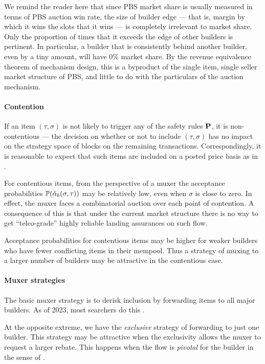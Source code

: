 We remind the reader here that since PBS market share is usually measured in terms of PBS auction win rate, the size of builder edge --- that is, margin by which it wins the slots that it wins --- is completely irrelevant to market share. 
%
Only the proportion of times that it exceeds the edge of other builders is pertinent.
%
In particular, a builder that is consistently behind another builder, even by a tiny amount, will have $0\%$ market share.
%
By the revenue equivalence theorem of mechanism design, this is a byproduct of the single item, single seller market structure of PBS, and little to do with the particulars of the auction mechanism.

\paragraph{Contention}
%
If an item $(\tau,\sigma)$ is not likely to trigger any of the safety rules $\mathbf{P}$, it is non-contentious --- the decision on whether or not to include $(\tau,\sigma)$ has no impact on the strategy space of blocks on the remaining transactions.
%
Correspondingly, it is reasonable to expect that such items are included on a posted price basis as in \cite{roughgarden2021transaction}.

For contentious items, from the perspective of a muxer the acceptance probabilities $\mathbb{P}(\tilde\alpha_b(\sigma,\tau))$ may be relatively low, even when $\sigma$ is close to zero. 
%
In effect, the muxer faces a combinatorial auction over each point of contention.
%
A consequence of this is that under the current market structure there is no way to get ``telco-grade'' highly reliable landing assurances on such flow.

Acceptance probabilities for contentious items may be higher for weaker builders who have fewer conflicting items in their mempool.
%
Thus a strategy of muxing to a larger number of builders may be attractive in the contentious case.

\paragraph{Muxer strategies}
%
The basic muxer strategy is to derisk inclusion by forwarding items to all major builders.
%
As of 2023, most searchers do this \cite{titan2023builder}.

At the opposite extreme, we have the \emph{exclusive} strategy of forwarding to just one builder.
%
This strategy may be attractive when the exclusivity allows the muxer to request a larger rebate.
%
This happens when the flow is \emph{pivotal} for the builder in the sense of \cite{yang2024decentralization}.

